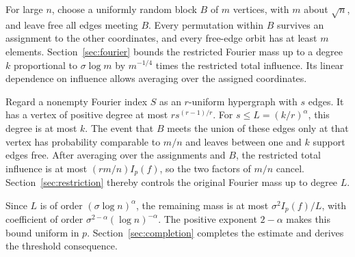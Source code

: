 For large $n$, choose a uniformly random block $B$ of $m$ vertices,
with $m$ about $\sqrt n$, and leave free all edges meeting $B$.
Every permutation within $B$ survives an assignment to the other
coordinates, and every free-edge orbit has at least $m$ elements.
Section~\ref{sec:fourier} bounds the restricted Fourier mass up to
a degree $k$ proportional to $\sigma\log m$ by $m^{-1/4}$ times
the restricted total influence. Its linear dependence on influence
allows averaging over the assigned coordinates.

Regard a nonempty Fourier index $S$ as an $r$-uniform hypergraph
with $s$ edges. It has a vertex of positive degree at most
$r s^{(r-1)/r}$. For $s\le L=(k/r)^\alpha$, this degree is at
most $k$. The event that $B$ meets the union of these edges only
at that vertex has probability comparable to $m/n$ and leaves
between one and $k$ support edges free. After averaging over the
assignments and $B$, the restricted total influence is at most
$(rm/n)I_p(f)$, so the two factors of $m/n$ cancel.
Section~\ref{sec:restriction} thereby controls the original
Fourier mass up to degree $L$.

Since $L$ is of order $(\sigma\log n)^\alpha$, the remaining
mass is at most $\sigma^2I_p(f)/L$, with coefficient of order
$\sigma^{2-\alpha}(\log n)^{-\alpha}$. The positive exponent
$2-\alpha$ makes this bound uniform in $p$.
Section~\ref{sec:completion} completes the estimate and derives
the threshold consequence.
